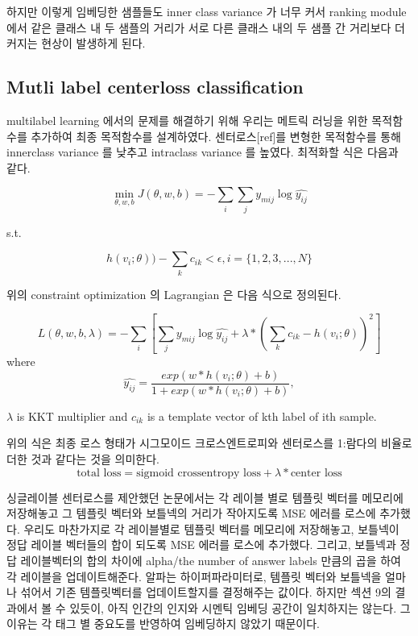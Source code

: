 하지만 이렇게 임베딩한 샘플들도 inner class variance 가 너무 커서 ranking module 에서 같은 클래스 내 두 샘플의 거리가 서로 다른 클래스 내의 두 샘플 간 거리보다 더 커지는 현상이 발생하게 된다. 


\subsection{Mutli label centerloss classification}
multilabel learning 에서의 문제를 해결하기 위해 우리는 메트릭 러닝을 위한 목적함수를 추가하여 최종 목적함수를 설계하였다. 센터로스[ref]를 변형한 목적함수를 통해 innerclass variance 를 낮추고 intraclass variance 를 높였다. 최적화할 식은 다음과 같다. 

\begin{equation}
\label{eqn:03}
\min_{\theta,w,b} J(\theta, w, b) = -\sum_i{\sum_j{ y_{mij} \log{\hat{y_{ij}}}}}
\end{equation}

s.t.

\begin{equation}
\label{eqn:04}
 h(v_i;\theta)) - \sum_k{c_{ik}} < \epsilon , i = \{1,2,3, ..., N\}
\end{equation}

위의 constraint optimization 의 Lagrangian 은 다음 식으로 정의된다.

\begin{equation}
\label{eqn:05}
L(\theta, w, b, \lambda) = -\sum_i{[ \sum_j{ y_{mij} \log{\hat{y_{ij}}}} + \lambda * (\sum_k{c_{ik}} - h(v_i;\theta))^2]} 
\end{equation}
where 
\[
\hat{y_{ij}} = \frac{exp(w*h(v_i;\theta)+b)}{ 1 + exp(w*h(v_i;\theta)+b)},
\]

$\lambda$ is KKT multiplier and $c_{ik}$ is a template vector of kth label of ith sample.

위의 식은 최종 로스 형태가 시그모이드 크로스엔트로피와 센터로스를 1:람다의 비율로 더한 것과 같다는 것을 의미한다. 
\[
\text{total loss} = \text{sigmoid crossentropy loss} + \lambda*\text{center loss}
\]



싱글레이블 센터로스를 제안했던 논문에서는 각 레이블 별로 템플릿 벡터를 메모리에 저장해놓고 그 템플릿 벡터와 보틀넥의 거리가 작아지도록 MSE 에러를 로스에 추가했다. 우리도 마찬가지로 각 레이블별로 템플릿 벡터를 메모리에 저장해놓고, 보틀넥이 정답 레이블 벡터들의 합이 되도록 MSE 에러를 로스에 추가했다. 그리고, 보틀넥과 정답 레이블벡터의 합의 차이에 alpha/the number of answer labels 만큼의 곱을 하여 각 레이블을 업데이트해준다. 알파는 하이퍼파라미터로, 템플릿 벡터와 보틀넥을 얼마나 섞어서 기존 템플릿벡터를 업데이트할지를 결정해주는 값이다. 하지만 섹션 9의 결과에서 볼 수 있듯이, 아직 인간의 인지와 시멘틱 임베딩 공간이 일치하지는 않는다. 그 이유는 각 태그 별 중요도를 반영하여 임베딩하지 않았기 때문이다. 


